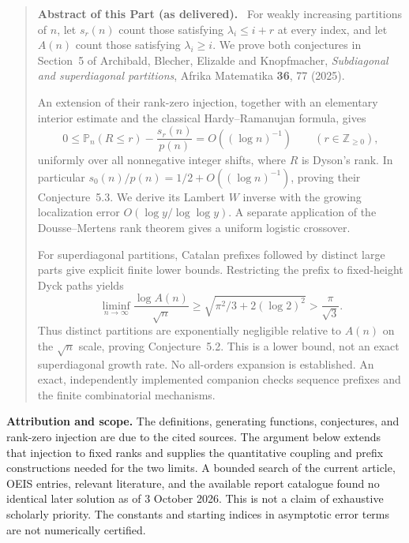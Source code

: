 \documentclass[11pt,letterpaper]{article}
\numberwithin{equation}{section}
\theoremstyle{remark}\newtheorem{remark}[theorem]{Remark}
\newcommand{\PP}{\mathbb P}
\newcommand{\ZZ}{\mathbb Z}
\newenvironment{partabstract}{\begin{quote}\small\noindent\textbf{Abstract of this Part (as delivered).}\ }{\end{quote}}
\begin{document}
\begin{partabstract}
For weakly increasing partitions of $n$, let $s_r(n)$ count those satisfying
$\lambda_i\leq i+r$ at every index, and let $A(n)$ count those satisfying
$\lambda_i\geq i$. We prove both conjectures in Section~5 of Archibald,
Blecher, Elizalde and Knopfmacher, \emph{Subdiagonal and superdiagonal
partitions}, Afrika Matematika \textbf{36}, 77 (2025).

An extension of their rank-zero injection, together with an elementary
interior estimate and the classical Hardy--Ramanujan formula, gives
\[
 0\leq\PP_n(R\leq r)-\frac{s_r(n)}{p(n)}=O((\log n)^{-1})
 \qquad(r\in\ZZ_{\geq0}),
\]
uniformly over all nonnegative integer shifts, where $R$ is Dyson's rank.
In particular $s_0(n)/p(n)=1/2+O((\log n)^{-1})$, proving their
Conjecture~5.3. We derive its Lambert $W$ inverse with the growing
localization error $O(\log y/\log\log y)$. A separate application of
the Dousse--Mertens rank theorem gives a uniform logistic crossover.

For superdiagonal partitions, Catalan prefixes followed by distinct
large parts give explicit finite lower bounds. Restricting the prefix
to fixed-height Dyck paths yields
\[
 \liminf_{n\to\infty}\frac{\log A(n)}{\sqrt n}
 \geq \sqrt{\pi^2/3+2(\log2)^2}>\frac\pi{\sqrt3}.
\]
Thus distinct partitions are exponentially negligible relative to
$A(n)$ on the $\sqrt n$ scale, proving Conjecture~5.2. This is a lower
bound, not an exact superdiagonal growth rate. No all-orders expansion
is established. An exact, independently implemented companion checks
sequence prefixes and the finite combinatorial mechanisms.
\end{partabstract}
\noindent\textbf{Attribution and scope.}
The definitions, generating functions, conjectures, and rank-zero
injection are due to the cited sources. The argument below extends
that injection to fixed ranks and supplies the quantitative coupling
and prefix constructions needed for the two limits. A bounded search
of the current article, OEIS entries, relevant literature, and the
available report catalogue found no identical later solution as of
3 October 2026. This is not a claim of exhaustive scholarly priority.
The constants and starting indices in asymptotic error terms are not
numerically certified.
\medskip
\end{document}
